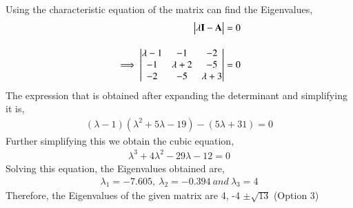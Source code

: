 Using the characteristic equation of the matrix can find the Eigenvalues,
\begin{align}
\begin{vmatrix}\lambda\mathbf{I} - \mathbf{A}\end{vmatrix} = 0\\[1em]
\implies \begin{vmatrix}\lambda-1 & -1 & -2 \\ -1 & \lambda+2 & -5 \\ -2 & -5 & \lambda+3\end{vmatrix} = 0
\end{align}
The expression that is obtained after expanding the determinant and simplifying it is,
\begin{align}
(\lambda-1)(\lambda^{2}+5\lambda-19) - (5\lambda+31) = 0 
\end{align}
Further simplifying this we obtain the cubic equation,
\begin{align}
\lambda^{3}+4\lambda^{2}-29\lambda-12 = 0
\end{align}
Solving this equation, the Eigenvalues obtained are,
\begin{align}
\lambda_{1} = -7.605,\ \lambda_{2} = -0.394 \ and \ \lambda_{3} = 4
\end{align}
Therefore, the Eigenvalues of the given matrix are 4, -4 $\pm\sqrt{13}$ (Option 3)
